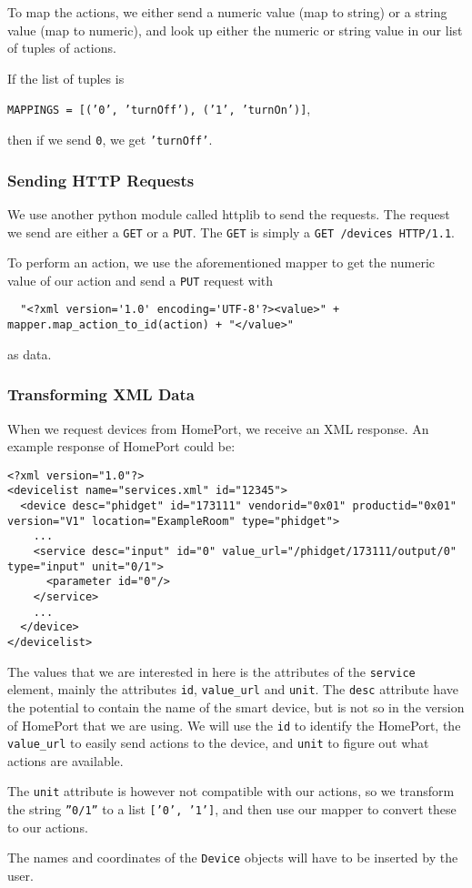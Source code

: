 To map the actions, we either send a numeric value (map to string) or a string value (map to numeric), 
and look up either the numeric or string value in our list of tuples of actions. 

If the list of tuples is
\begin{center}
  \texttt{MAPPINGS = [('0', 'turnOff'), ('1', 'turnOn')]},
\end{center}
then if we send \texttt{0}, we get \texttt{'turnOff'}. 

\subsubsection{Sending HTTP Requests}
We use another python module called httplib to send the requests. 
The request we send are either a \texttt{GET} or a \texttt{PUT}. 
The \texttt{GET} is simply a \texttt{GET /devices HTTP/1.1}. 

To perform an action, we use the aforementioned mapper to get the numeric value of our action and send a \texttt{PUT} request with 
  \begin{verbatim}
  "<?xml version='1.0' encoding='UTF-8'?><value>" + mapper.map_action_to_id(action) + "</value>"
  \end{verbatim}
as data. 

\subsubsection{Transforming XML Data}
When we request devices from HomePort, 
we receive an XML response. 
An example response of HomePort could be:
\begin{verbatim}
<?xml version="1.0"?>
<devicelist name="services.xml" id="12345">
  <device desc="phidget" id="173111" vendorid="0x01" productid="0x01" version="V1" location="ExampleRoom" type="phidget">
    ...
    <service desc="input" id="0" value_url="/phidget/173111/output/0" type="input" unit="0/1">
      <parameter id="0"/>
    </service>
    ...
  </device>
</devicelist>
\end{verbatim}

The values that we are interested in here is the attributes of the \texttt{service} element, 
mainly the attributes \texttt{id}, \texttt{value\_url} and \texttt{unit}. 
The \texttt{desc} attribute have the potential to contain the name of the smart device, 
but is not so in the version of HomePort that we are using. 
We will use the \texttt{id} to identify the HomePort, 
the \texttt{value\_url} to easily send actions to the device, 
and \texttt{unit} to figure out what actions are available. 

The \texttt{unit} attribute is however not compatible with our actions, 
so we transform the string \texttt{''0/1''} to a list \texttt{['0', '1']}, 
and then use our mapper to convert these to our actions. 

The names and coordinates of the \texttt{Device} objects will have to be inserted by the user. 


